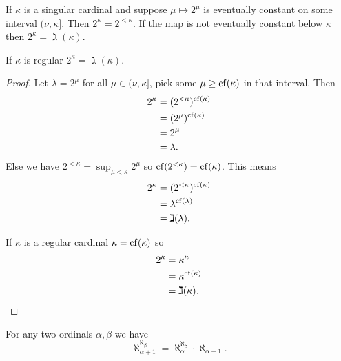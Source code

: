 \begin{proposition}
    If \(\kappa\) is a singular cardinal and suppose \(\mu\mapsto 2^{\mu}\) is
    eventually constant on some interval \((\nu,\kappa]\). Then
    \(2^{\kappa}=2^{<\kappa}\). If the map is not eventually constant below
    \(\kappa\) then \(2^{\kappa}=\gimel(\kappa)\).

    If \(\kappa\) is regular \(2^{\kappa}=\gimel(\kappa)\).

    \begin{proof}
        Let \(\lambda=2^{\mu}\) for all \(\mu\in(\nu,\kappa]\), pick some
        \(\mu\geq\operatorname{cf}(\kappa)\) in that interval. Then
        \begin{align*}
            2^{\kappa} & =(2^{<\kappa})^{\operatorname{cf}(\kappa)} \\
                       & =(2^{\mu})^{\operatorname{cf}(\kappa)}     \\
                       & =2^{\mu}                     \\
                       & =\lambda.
        \end{align*}
        Else we have \(2^{<\kappa}=\sup_{\mu<\kappa}2^{\mu}\) so
        \(\operatorname{cf}(2^{<\kappa})=\operatorname{cf}(\kappa)\). This means
        \begin{align*}
            2^{\kappa} & =(2^{<\kappa})^{\operatorname{cf}(\kappa)} \\
                       & =\lambda^{\operatorname{cf}(\lambda)}      \\
                       & =\gimel(\lambda).
        \end{align*}

        If \(\kappa\) is a regular cardinal \(\kappa=\operatorname{cf}(\kappa)\) so
        \begin{align*}
            2^{\kappa} & =\kappa^{\kappa}      \\
                       & =\kappa^{\operatorname{cf}(\kappa)} \\
                       & =\gimel(\kappa).
        \end{align*}
    \end{proof}
\end{proposition}

\begin{theorem}
    For any two ordinals \(\alpha,\beta\) we have
    \[
        \aleph_{\alpha+1}^{\aleph_{\beta}}=\aleph_{\alpha}^{\aleph_{\beta}}\cdot\aleph_{\alpha+1}.
    \]
\end{theorem}

